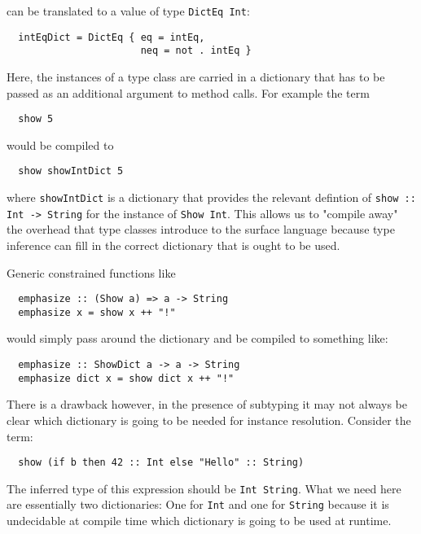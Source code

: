 can be translated to a value of type \texttt{DictEq Int}:

\begin{verbatim}
  intEqDict = DictEq { eq = intEq,
                       neq = not . intEq }
\end{verbatim}

Here, the instances of a type class are carried in a dictionary that has to be passed as an additional argument to method calls.
For example the term

\begin{verbatim}
  show 5
\end{verbatim}

would be compiled to

\begin{verbatim}
  show showIntDict 5
\end{verbatim}

where \texttt{showIntDict} is a dictionary that provides the relevant defintion of \texttt{show :: Int -> String} for the instance of \texttt{Show Int}.
This allows us to "compile away" the overhead that type classes introduce to the surface language because type inference can fill in the correct dictionary that is ought to be used.

Generic constrained functions like

\begin{verbatim}
  emphasize :: (Show a) => a -> String
  emphasize x = show x ++ "!"
\end{verbatim}

would simply pass around the dictionary and be compiled to something like:

\begin{verbatim}
  emphasize :: ShowDict a -> a -> String
  emphasize dict x = show dict x ++ "!"
\end{verbatim}

\cite{kiselyov}

There is a drawback however, in the presence of subtyping it may not always be clear which dictionary is going to be needed for instance resolution.
Consider the term:

\begin{verbatim}
  show (if b then 42 :: Int else "Hello" :: String)
\end{verbatim}

The inferred type of this expression should be \texttt{Int \/ String}.
What we need here are essentially two dictionaries: One for \texttt{Int} and one for \texttt{String} because it is undecidable at compile time which dictionary is going to be used at runtime.

